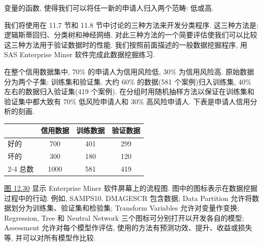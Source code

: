
变量的函数, 使得我们可以将任一新的申请人归入两个范畴: 低或高.

我们将使用在 11.7 节和 11.8 节中讨论的三种方法来开发分类程序. 这三种方法是: 逻辑斯蒂回归、分类树和神经网络. 对此三种方法的一个简要评估使我们可以比较这三种方法用于验证数据时的性能. 我们按照前面描述的一般数据挖掘程序, 用 SAS Enterprise Miner 软件完成此数据挖掘练习.

在整个信用数据集中, 70\% 的申请人为信用风险低, 30\% 为信用风险高. 原始数据分为两个子集: 训练集和验证集. 大约 60\% 的数据(581 个案例)归入训练集, 40\% 左右的数据归入验证集(419 个案例). 在分组时用随机抽样方法以保证在训练集和验证集中都大致有 70\% 低风险申请人和 30\% 高风险申请人. 下表是申请人信用分析的刻画.

\begin{mvtable}
\setlength{\tabcolsep}{16pt}%
\begin{tabular}{lccc}
\toprule
& \textbf{信用数据} & \textbf{训练数据} & \textbf{验证数据} \\
\midrule
好的 & 700 & 401 & 299 \\
坏的 & 300 & 180 & 120 \\
\cmidrule{2-4}
总数 & 1000 & 581 & 419 \\
\bottomrule
\end{tabular}
\end{mvtable}

\hyperref[fig:12.30]{图 12.30} 显示 Enterprise Miner 软件屏幕上的流程图. 图中的图标表示在数据挖掘过程中的行动. 例如, SAMPS10. DMAGESCR 包含数据; Data Partition 允许将数据划分为训练集、验证集和检验集; Transform Variables 允许对变量作变换; Regression, Tree 和 Neutral Network 三个图标可分别打开以开发各自的模型; Assessment 允许对每个模型作评估, 使用的方法有预测功效、提升、收益或损失等, 并可以对所有模型作比较.

